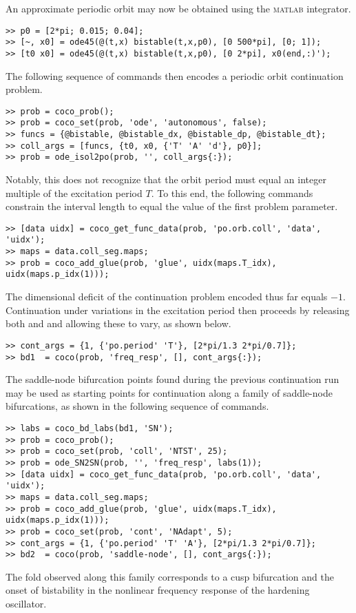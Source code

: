 An approximate periodic orbit may now be obtained using the  \textsc{matlab} integrator.
\begin{lstlisting}[language=coco-highlight]
>> p0 = [2*pi; 0.015; 0.04];
>> [~, x0] = ode45(@(t,x) bistable(t,x,p0), [0 500*pi], [0; 1]); 
>> [t0 x0] = ode45(@(t,x) bistable(t,x,p0), [0 2*pi], x0(end,:)');
\end{lstlisting}
The following sequence of commands then encodes a periodic orbit continuation problem.\begin{lstlisting}[language=coco-highlight]
>> prob = coco_prob();
>> prob = coco_set(prob, 'ode', 'autonomous', false);
>> funcs = {@bistable, @bistable_dx, @bistable_dp, @bistable_dt};
>> coll_args = [funcs, {t0, x0, {'T' 'A' 'd'}, p0}];
>> prob = ode_isol2po(prob, '', coll_args{:});
\end{lstlisting}
Notably, this does not recognize that the orbit period must equal an integer multiple of the excitation period $T$. To this end, the following commands constrain the interval length to equal the value of the first problem parameter.
\begin{lstlisting}[language=coco-highlight]
>> [data uidx] = coco_get_func_data(prob, 'po.orb.coll', 'data', 'uidx');
>> maps = data.coll_seg.maps;
>> prob = coco_add_glue(prob, 'glue', uidx(maps.T_idx), uidx(maps.p_idx(1)));
\end{lstlisting}
The dimensional deficit of the continuation problem encoded thus far equals $-1$. Continuation under variations in the excitation period then proceeds by releasing both  and  and allowing these to vary, as shown below.
\begin{lstlisting}[language=coco-highlight]
>> cont_args = {1, {'po.period' 'T'}, [2*pi/1.3 2*pi/0.7]};
>> bd1  = coco(prob, 'freq_resp', [], cont_args{:});
\end{lstlisting}

The saddle-node bifurcation points found during the previous continuation run may be used as starting points for continuation along a family of saddle-node bifurcations, as shown in the following sequence of commands.
\begin{lstlisting}[language=coco-highlight]
>> labs = coco_bd_labs(bd1, 'SN');
>> prob = coco_prob();
>> prob = coco_set(prob, 'coll', 'NTST', 25);
>> prob = ode_SN2SN(prob, '', 'freq_resp', labs(1));
>> [data uidx] = coco_get_func_data(prob, 'po.orb.coll', 'data', 'uidx');
>> maps = data.coll_seg.maps;
>> prob = coco_add_glue(prob, 'glue', uidx(maps.T_idx), uidx(maps.p_idx(1)));
>> prob = coco_set(prob, 'cont', 'NAdapt', 5);
>> cont_args = {1, {'po.period' 'T' 'A'}, [2*pi/1.3 2*pi/0.7]};
>> bd2  = coco(prob, 'saddle-node', [], cont_args{:});
\end{lstlisting}
The fold observed along this family corresponds to a cusp bifurcation and the onset of bistability in the nonlinear frequency response of the hardening oscillator.

